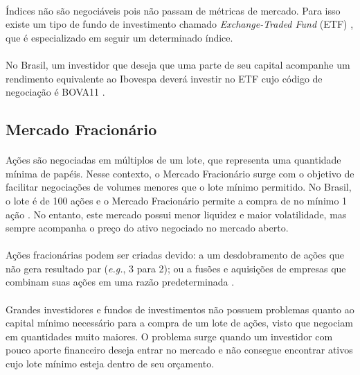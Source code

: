 \paragraph{} Índices não são negociáveis pois não passam de métricas de mercado. Para isso existe um tipo de fundo de investimento chamado \textit{Exchange-Traded Fund} (ETF) \cite{etf}, que é especializado em seguir um determinado índice.

\paragraph{} No Brasil, um investidor que deseja que uma parte de seu capital acompanhe um rendimento equivalente ao Ibovespa deverá investir no ETF cujo código de negociação é BOVA11 \cite{etfs_listados}.



\FloatBarrier
\subsection{Mercado Fracionário}

\paragraph{} Ações são negociadas em múltiplos de um lote, que representa uma quantidade mínima de papéis. Nesse contexto, o Mercado Fracionário surge com o objetivo de facilitar negociações de volumes menores que o lote mínimo permitido. No Brasil, o lote é de 100 ações e o Mercado Fracionário permite a compra de no mínimo 1 ação \cite{mercado_fracionario}. No entanto, este mercado possui menor liquidez e maior volatilidade, mas sempre acompanha o preço do ativo negociado no mercado aberto.

\paragraph{} Ações fracionárias podem ser criadas devido: a um desdobramento de ações que não gera resultado par (\textit{e.g.}, 3 para 2); ou a fusões e aquisições de empresas que combinam suas ações em uma razão predeterminada \cite{mercado_fracionario}.

\paragraph{} Grandes investidores e fundos de investimentos não possuem problemas quanto ao capital mínimo necessário para a compra de um lote de ações, visto que negociam em quantidades muito maiores. O problema surge quando um investidor com pouco aporte financeiro deseja entrar no mercado e não consegue encontrar ativos cujo lote mínimo esteja dentro de seu orçamento.



